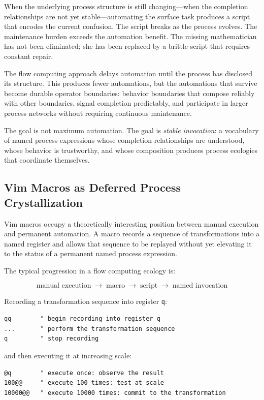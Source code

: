 \documentclass[12pt, a4paper]{article}
\begin{document}
When the underlying process structure is still changing---when
the completion relationships are not yet stable---automating the
surface task produces a script that encodes the current confusion.
The script breaks as the process evolves. The maintenance burden
exceeds the automation benefit. The missing mathematician has not
been eliminated; she has been replaced by a brittle script that
requires constant repair.

The flow computing approach delays automation until the process
has disclosed its structure. This produces fewer automations, but
the automations that survive become durable operator boundaries:
behavior boundaries that compose reliably with other boundaries,
signal completion predictably, and participate in larger
process networks without requiring continuous maintenance.

The goal is not maximum automation. The goal is \emph{stable
invocation}: a vocabulary of named process expressions whose
completion relationships are understood, whose behavior is
trustworthy, and whose composition produces process ecologies
that coordinate themselves.

\subsection{Vim Macros as Deferred Process Crystallization}

Vim macros occupy a theoretically interesting position between
manual execution and permanent automation. A macro records a
sequence of transformations into a named register and allows that
sequence to be replayed without yet elevating it to the status of
a permanent named process expression.

The typical progression in a flow computing ecology is:

\[
\text{manual execution}
\;\to\;
\text{macro}
\;\to\;
\text{script}
\;\to\;
\text{named invocation}
\]

Recording a transformation sequence into register \texttt{q}:

\begin{lstlisting}
qq        " begin recording into register q
...       " perform the transformation sequence
q         " stop recording
\end{lstlisting}

and then executing it at increasing scale:

\begin{lstlisting}
@q        " execute once: observe the result
100@@     " execute 100 times: test at scale
10000@@   " execute 10000 times: commit to the transformation
\end{lstlisting}
\end{document}
